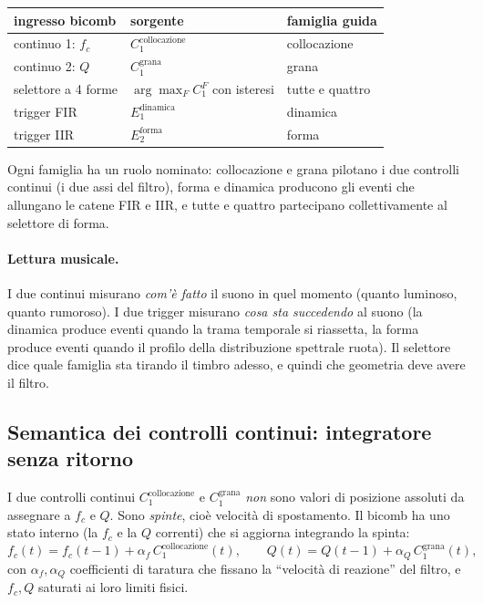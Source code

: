 \documentclass[a4paper,11pt]{article}
\begin{document}
\begin{center}
\begin{tabular}{lll}
\toprule
ingresso bicomb & sorgente & famiglia guida \\
\midrule
continuo 1: $f_c$         & $C_1^{\text{collocazione}}$ & collocazione \\
continuo 2: $Q$           & $C_1^{\text{grana}}$   & grana \\
selettore a 4 forme       & $\arg\max_F C_1^F$ con isteresi & tutte e quattro \\
trigger FIR               & $E_1^{\text{dinamica}}$     & dinamica \\
trigger IIR               & $E_2^{\text{forma}}$        & forma \\
\bottomrule
\end{tabular}
\end{center}

Ogni famiglia ha un ruolo nominato: collocazione e grana pilotano
i due controlli continui (i due assi del filtro), forma e dinamica
producono gli eventi che allungano le catene FIR e IIR, e tutte e
quattro partecipano collettivamente al selettore di forma.

\paragraph{Lettura musicale.}
I due continui misurano \emph{com'è fatto} il suono in quel momento
(quanto luminoso, quanto rumoroso). I due trigger misurano
\emph{cosa sta succedendo} al suono (la dinamica produce eventi quando
la trama temporale si riassetta, la forma produce eventi quando il
profilo della distribuzione spettrale ruota). Il selettore dice quale
famiglia sta tirando il timbro adesso, e quindi che geometria deve
avere il filtro.

\subsection{Semantica dei controlli continui: integratore senza ritorno}

I due controlli continui $C_1^{\text{collocazione}}$ e
$C_1^{\text{grana}}$ \emph{non} sono valori di posizione assoluti
da assegnare a $f_c$ e $Q$. Sono \emph{spinte}, cioè velocità di
spostamento. Il bicomb ha uno stato interno (la $f_c$ e la $Q$ correnti)
che si aggiorna integrando la spinta:
\[
f_c(t) = f_c(t-1) + \alpha_{f}\,C_1^{\text{collocazione}}(t),
\qquad
Q(t) = Q(t-1) + \alpha_{Q}\,C_1^{\text{grana}}(t),
\]
con $\alpha_f, \alpha_Q$ coefficienti di taratura che fissano la
``velocità di reazione'' del filtro, e $f_c, Q$ saturati ai loro
limiti fisici.
\end{document}

